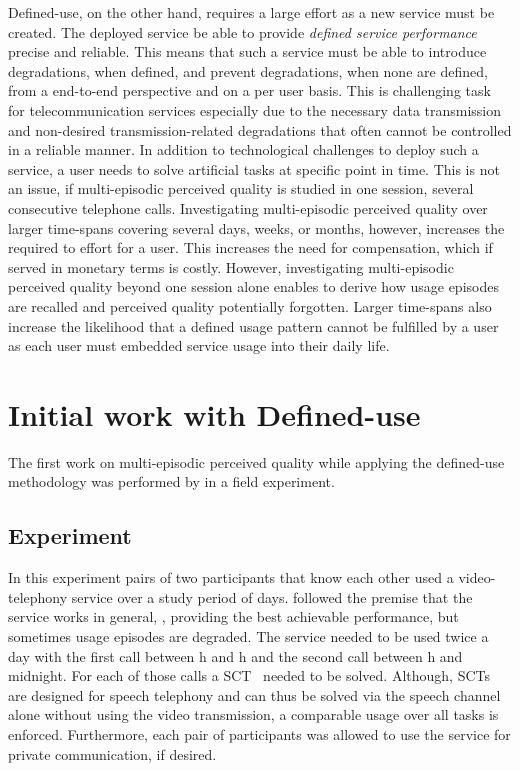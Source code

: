 Defined-use, on the other hand, requires a large effort as a new service must be created.
The deployed service be able to provide \emph{defined service performance} precise and reliable.
This means that such a service must be able to introduce degradations, when defined, and prevent degradations, when none are defined, from a end-to-end perspective and on a per user basis.
This is challenging task for telecommunication services especially due to the necessary data transmission and non-desired transmission-related degradations that often cannot be controlled in a reliable manner.
In addition to technological challenges to deploy such a service, a user needs to solve artificial tasks at specific point in time.
This is not an issue, if multi-episodic perceived quality is studied in one session, \eg several consecutive telephone calls.
Investigating multi-episodic perceived quality over larger time-spans covering several days, weeks, or months, however, increases the required to effort for a user.
This increases the need for compensation, which if served in monetary terms is costly.
However, investigating multi-episodic perceived quality beyond one session alone enables to derive how usage episodes are recalled and perceived quality potentially forgotten.
Larger time-spans also increase the likelihood that a defined usage pattern cannot be fulfilled by a user as each user must embedded service usage into their daily life.

\section{Initial work with Defined-use}
The first work on multi-episodic perceived quality while applying the defined-use methodology was performed by \citet{moller_single-call_2011} in a field experiment.

\subsection{Experiment \citep{moller_single-call_2011}}
In this experiment pairs of two participants that know each other used a video-telephony service over a study period of \unit[12]{days}.
\citet{moller_single-call_2011} followed the premise that the service works in general, \ie, providing the best achievable performance, but sometimes usage episodes are degraded.
The service needed to be used twice a day with the first call between \unit[6]{h} and \unit[15]{h} and the second call between \unit[15]{h} and midnight.
For each of those \unit[24]{calls} a \acf{SCT}~\citep{itu-t_p.805:_2007} needed to be solved. %
Although, \acp{SCT} are designed for speech telephony and can thus be solved via the speech channel alone without using the video transmission, a comparable usage over all tasks is enforced.
Furthermore, each pair of participants was allowed to use the service for private communication, if desired.

